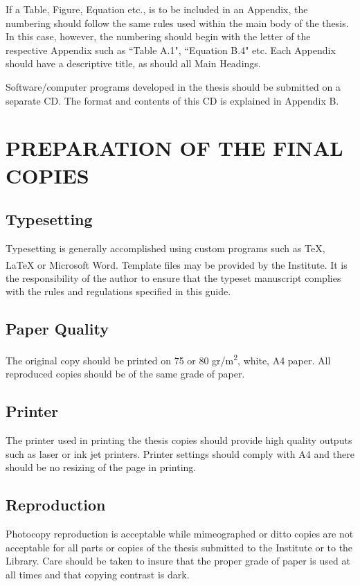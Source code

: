 \documentclass[a4paper,oneside,12pt]{report}
\numberwithin{equation}{chapter}
\begin{document}
If a Table, Figure, Equation etc., is to be included in an
Appendix, the numbering should follow the same rules used within
the main body of the thesis. In this case, however, the numbering should begin with the letter
of the respective Appendix such as ``Table A.1", ``Equation B.4" etc.
Each Appendix should have a descriptive title, as should all Main Headings.

Software/computer programs developed in the thesis should be submitted on a separate CD. The format and contents of this CD is explained in Appendix B.



\chapter{PREPARATION OF THE FINAL COPIES}


\section{Typesetting}
Typesetting is generally accomplished using custom programs such as \TeX{}, \LaTeX{} or Microsoft Word\textsuperscript{\textregistered}. Template files may be provided by the Institute. It is the responsibility of the author to ensure that the typeset manuscript complies with the rules and regulations specified in this guide.


\section{Paper Quality}
The original copy should be printed on 75 or 80 gr/m\textsuperscript{2}, white, A4 paper. All reproduced copies should be of the same grade of paper.


\section{Printer}
The printer used in printing the thesis copies should provide high quality outputs such as laser or ink jet printers. Printer settings should comply with A4 and there should be no resizing of the page in printing.


\section{Reproduction}
Photocopy reproduction is acceptable while mimeographed or ditto
copies are not acceptable for all parts or copies of the thesis
submitted to the Institute or to the Library. Care should be taken to
insure that the proper grade of paper is used at all times and that
copying contrast is dark.
\end{document}
